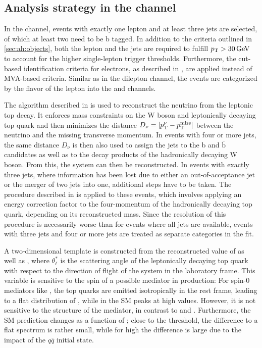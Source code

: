 \subsection{Analysis strategy in the \texorpdfstring{\ljets}{l+jets} channel}
\label{sec:ah:ljets}

In the \ljets channel, events with exactly one lepton and at least three jets are selected, of which at least two need to be b tagged. In addition to the criteria outlined in \cref{sec:ah:objects}, both the lepton and the jets are required to fulfill $\pt > \SI{30}{\GeV}$ to account for the higher single-lepton trigger thresholds. Furthermore, the cut-based identification criteria for electrons, as described in , are applied instead of MVA-based criteria. Similar as in the dilepton channel, the events are categorized by the flavor of the lepton into the \ejets and \mujets channels.

The algorithm described in  is used to reconstruct the neutrino from the leptonic top decay. It enforces mass constraints on the W boson and leptonically decaying top quark and then minimizes the distance $D_\nu = |p_{\mathrm{T}}^\nu - p_{\mathrm{T}}^{\mathrm{miss}}|$ between the neutrino \pt and the missing transverse momentum. In events with four or more jets, the same distance $D_\nu$ is then also used to assign the jets to the b and $\bar{\mathrm{b}}$ candidates as well as to the decay products of the hadronically decaying W boson. From this, the \ttbar system can then be reconstructed. In events with exactly three jets, where information has been lost due to either an out-of-acceptance jet or the merger of two jets into one, additional steps have to be taken. The procedure described in  is applied to these events, which involves applying an energy correction factor to the four-momentum of the hadronically decaying top quark, depending on its reconstructed mass. Since the resolution of this procedure is necessarily worse than for events where all jets are available, events with three jets and four or more jets are treated as separate categories in the fit.

A two-dimensional template is constructed from the reconstructed value of \mtt as well as \abscostl, where $\theta^*_\ell$ is the scattering angle of the leptonically decaying top quark with respect to the direction of flight of the \ttbar system in the laboratory frame. This variable is sensitive to the spin of a possible mediator in \ttbar production: For spin-0 mediators like \AH, the top quarks are emitted isotropically in the \ttbar rest frame, leading to a flat distribution of \abscostl, while in the SM \abscostl peaks at high values. However, it is not sensitive to the \CP structure of the mediator, in contrast to \chel and \chan. Furthermore, the SM prediction changes as a function of \mtt; close to the \ttbar threshold, the difference to a flat spectrum is rather small, while for high \mtt the difference is large due to the impact of the $q\bar{q}$ initial state. 

